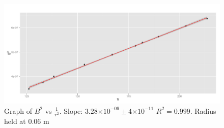 \documentclass[twocolumn,secnumarabic,amssymb, nobibnotes, aps, pra]{revtex4}
\providecommand{\e}[1]{\ensuremath{\times 10^{#1}}}
\begin{document}
\begin{figure}[b]
\begin{center}
\includegraphics[scale=.6]{plot3.pdf}
\end{center}
\caption{Graph of $B^2$ vs $\frac{1}{r^2}$.  Slope: $3.28\e{-09} \pm 4\e{-11}$ $R^2 = 0.999$. Radius held at 0.06 m}
\label{fig:three}
\end{figure}

\begin{thebibliography}{5}

\end{thebibliography}
\end{document}

